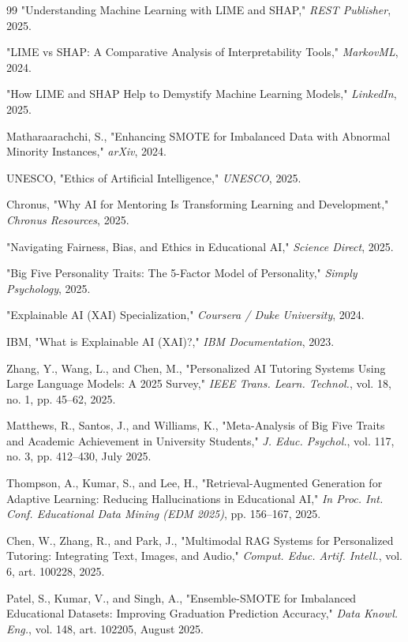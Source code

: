 \documentclass[conference]{IEEEtran}
\begin{document}
\begin{thebibliography}{99}
 "Understanding Machine Learning with LIME and SHAP," \textit{REST Publisher}, 2025.

 "LIME vs SHAP: A Comparative Analysis of Interpretability Tools," \textit{MarkovML}, 2024.

 "How LIME and SHAP Help to Demystify Machine Learning Models," \textit{LinkedIn}, 2025.

 Matharaarachchi, S., "Enhancing SMOTE for Imbalanced Data with Abnormal Minority Instances," \textit{arXiv}, 2024.

 UNESCO, "Ethics of Artificial Intelligence," \textit{UNESCO}, 2025.

 Chronus, "Why AI for Mentoring Is Transforming Learning and Development," \textit{Chronus Resources}, 2025.

 "Navigating Fairness, Bias, and Ethics in Educational AI," \textit{Science Direct}, 2025.

 "Big Five Personality Traits: The 5-Factor Model of Personality," \textit{Simply Psychology}, 2025.

 "Explainable AI (XAI) Specialization," \textit{Coursera / Duke University}, 2024.

 IBM, "What is Explainable AI (XAI)?," \textit{IBM Documentation}, 2023.

 Zhang, Y., Wang, L., and Chen, M., "Personalized AI Tutoring Systems Using Large Language Models: A 2025 Survey," \textit{IEEE Trans. Learn. Technol.}, vol. 18, no. 1, pp. 45--62, 2025.

 Matthews, R., Santos, J., and Williams, K., "Meta-Analysis of Big Five Traits and Academic Achievement in University Students," \textit{J. Educ. Psychol.}, vol. 117, no. 3, pp. 412--430, July 2025.

 Thompson, A., Kumar, S., and Lee, H., "Retrieval-Augmented Generation for Adaptive Learning: Reducing Hallucinations in Educational AI," \textit{In Proc. Int. Conf. Educational Data Mining (EDM 2025)}, pp. 156--167, 2025.

 Chen, W., Zhang, R., and Park, J., "Multimodal RAG Systems for Personalized Tutoring: Integrating Text, Images, and Audio," \textit{Comput. Educ. Artif. Intell.}, vol. 6, art. 100228, 2025.

 Patel, S., Kumar, V., and Singh, A., "Ensemble-SMOTE for Imbalanced Educational Datasets: Improving Graduation Prediction Accuracy," \textit{Data Knowl. Eng.}, vol. 148, art. 102205, August 2025.


\end{thebibliography}
\end{document}
